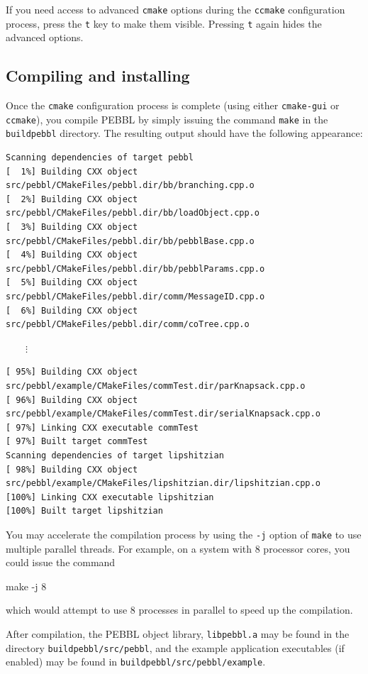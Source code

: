 If you need access to advanced \texttt{cmake} options during the
\texttt{ccmake} configuration process, press the \texttt{t} key to make them
visible.  Pressing \texttt{t} again hides the advanced options.

\subsection{Compiling and installing}
Once the \texttt{cmake} configuration process is complete (using either
\texttt{cmake-gui} or \texttt{ccmake}), you compile PEBBL by simply issuing
the command \texttt{make} in the \texttt{buildpebbl} directory.  The resulting
output should have the following appearance:
{\footnotesize
\begin{verbatim}
Scanning dependencies of target pebbl
[  1%] Building CXX object src/pebbl/CMakeFiles/pebbl.dir/bb/branching.cpp.o
[  2%] Building CXX object src/pebbl/CMakeFiles/pebbl.dir/bb/loadObject.cpp.o
[  3%] Building CXX object src/pebbl/CMakeFiles/pebbl.dir/bb/pebblBase.cpp.o
[  4%] Building CXX object src/pebbl/CMakeFiles/pebbl.dir/bb/pebblParams.cpp.o
[  5%] Building CXX object src/pebbl/CMakeFiles/pebbl.dir/comm/MessageID.cpp.o
[  6%] Building CXX object src/pebbl/CMakeFiles/pebbl.dir/comm/coTree.cpp.o
\end{verbatim}
\vspace{-1.3ex}
$\qquad\vdots$
\begin{verbatim}
[ 95%] Building CXX object src/pebbl/example/CMakeFiles/commTest.dir/parKnapsack.cpp.o
[ 96%] Building CXX object src/pebbl/example/CMakeFiles/commTest.dir/serialKnapsack.cpp.o
[ 97%] Linking CXX executable commTest
[ 97%] Built target commTest
Scanning dependencies of target lipshitzian
[ 98%] Building CXX object src/pebbl/example/CMakeFiles/lipshitzian.dir/lipshitzian.cpp.o
[100%] Linking CXX executable lipshitzian
[100%] Built target lipshitzian
\end{verbatim}
}

You may accelerate the compilation process by using the \texttt{-j} option of
\texttt{make} to use multiple parallel threads.  For example, on a system with
8 processor cores, you could issue the command
\begin{codeblock}
make -j 8
\end{codeblock}
which would attempt to use 8 processes in parallel to speed up the compilation.

After compilation, the PEBBL object library, \texttt{libpebbl.a} may be found
in the directory \texttt{buildpebbl/src/pebbl}, and the example application
executables (if enabled) may be found in
\texttt{buildpebbl/src/pebbl/example}.


